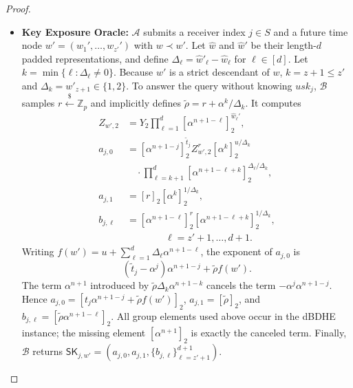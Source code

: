 \documentclass[sigconf,anonymous]{acmart}
\theoremstyle{definition}
\theoremstyle{definition}
\theoremstyle{definition}
\theoremstyle{definition}
\theoremstyle{definition}
\theoremstyle{definition}
\theoremstyle{definition}
\theoremstyle{definition}
\theoremstyle{definition}
\begin{document}
\begin{proof}
\begin{itemize}
		For every matching entry, $\mathcal{B}$ checks whether
		$e([1]_1,C_4)=
		e(upk_{i,0},[\alpha^{n+1-i}]_2)
		e(Z_{w,1}[\alpha^{n-z}]_1^{h},C_3)$.
		If no matching entry satisfies the verification equation,
		$\mathcal{B}$ returns $\perp$.
		
		Otherwise, let $(K,h)$ be a matching pair that satisfies the
		verification equation. $\mathcal{B}$ obtains $R=H_0(K)$ according
		to its $H_0$ simulation and returns
		$M=C_5R^{-1}=C_5H_0(K)^{-1}$.
		
		\item \textbf{Key Exposure Oracle:}
		$\mathcal{A}$ submits a receiver index $j\in S$ and a future time node
		$w'=(w_1',\ldots,w_{z'}')$ with $w\prec w'$.
		Let $\widehat w$ and $\widehat w'$ be their length-$d$ padded
		representations, and define
		$\Delta_\ell=\widehat w'_\ell-\widehat w_\ell$ for
		$\ell\in[d]$. Let
		$k=\min\{\ell:\Delta_\ell\neq0\}$.
		Because $w'$ is a strict descendant of $w$, $k=z+1\leq z'$ and
		$\Delta_k=w'_{z+1}\in\{1,2\}$.
		To answer the query without knowing $usk_j$, $\mathcal{B}$ samples
		$r\overset{\$}{\leftarrow}\mathbb{Z}_p$ and implicitly defines
		$\widetilde{\rho}=r+\alpha^k/\Delta_k$.
		It computes
		\[
		\begin{aligned}
		Z_{w',2}
		&=Y_2\prod_{\ell=1}^{d}
		[\alpha^{n+1-\ell}]_2^{\widehat w_\ell'},\\
		a_{j,0}
		&=[\alpha^{n+1-j}]_2^{\widetilde t_j}Z_{w',2}^{r}
		[\alpha^k]_2^{u/\Delta_k}\\
		&\quad\cdot\prod_{\ell=k+1}^{d}
		[\alpha^{n+1-\ell+k}]_2^{
		\Delta_\ell/\Delta_k},\\
		a_{j,1}
		&=[r]_2[\alpha^k]_2^{1/\Delta_k},\\
		b_{j,\ell}
		&=[\alpha^{n+1-\ell}]_2^{r}
		[\alpha^{n+1-\ell+k}]_2^{1/\Delta_k},\\
		&\hspace{4em}\ell=z'+1,\ldots,d+1.
		\end{aligned}
		\]
		Writing
		$f(w')=u+\sum_{\ell=1}^{d}\Delta_\ell
		\alpha^{n+1-\ell}$, the exponent of $a_{j,0}$ is
		\[
		(\widetilde t_j-\alpha^j)\alpha^{n+1-j}
		+\widetilde\rho f(w').
		\]
		The term $\alpha^{n+1}$ introduced by
		$\widetilde\rho\Delta_k\alpha^{n+1-k}$ cancels the term
		$-\alpha^j\alpha^{n+1-j}$. Hence
		$a_{j,0}=[t_j\alpha^{n+1-j}+\widetilde\rho f(w')]_2$,
		$a_{j,1}=[\widetilde\rho]_2$, and
		$b_{j,\ell}=[\widetilde\rho\alpha^{n+1-\ell}]_2$.
		All group elements used above occur in the dBDHE instance; the missing
		element $[\alpha^{n+1}]_2$ is exactly the canceled term.
		Finally, $\mathcal{B}$ returns
		$\mathsf{SK}_{j,w'}=
		(a_{j,0},a_{j,1},
		\{b_{j,\ell}\}_{\ell=z'+1}^{d+1})$.
		

\end{itemize}
\end{proof}
\end{document}
